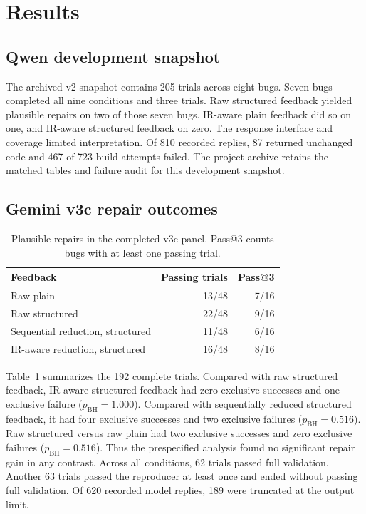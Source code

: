 \documentclass[conference]{IEEEtran}
\begin{document}
\section{Results}

\subsection{Qwen development snapshot}

The archived v2 snapshot contains 205 trials across eight bugs. Seven bugs completed all nine conditions and three trials. Raw structured feedback yielded plausible repairs on two of those seven bugs. IR-aware plain feedback did so on one, and IR-aware structured feedback on zero. The response interface and coverage limited interpretation. Of 810 recorded replies, 87 returned unchanged code and 467 of 723 build attempts failed. The project archive retains the matched tables and failure audit for this development snapshot.

\subsection{Gemini v3c repair outcomes}

\begin{table}[t]
\caption{Plausible repairs in the completed v3c panel. Pass@3 counts bugs with at least one passing trial.}
\label{tab:v3c-repair}
\centering\footnotesize
\begin{tabular}{@{}lrr@{}}
\toprule
Feedback & Passing trials & Pass@3 \\
\midrule
Raw plain & 13/48 & 7/16 \\
Raw structured & 22/48 & 9/16 \\
Sequential reduction, structured & 11/48 & 6/16 \\
IR-aware reduction, structured & 16/48 & 8/16 \\
\bottomrule
\end{tabular}
\end{table}

Table~\ref{tab:v3c-repair} summarizes the 192 complete trials. Compared with raw structured feedback, IR-aware structured feedback had zero exclusive successes and one exclusive failure ($p_{\mathrm{BH}}=1.000$). Compared with sequentially reduced structured feedback, it had four exclusive successes and two exclusive failures ($p_{\mathrm{BH}}=0.516$). Raw structured versus raw plain had two exclusive successes and zero exclusive failures ($p_{\mathrm{BH}}=0.516$). Thus the prespecified analysis found no significant repair gain in any contrast. Across all conditions, 62 trials passed full validation. Another 63 trials passed the reproducer at least once and ended without passing full validation. Of 620 recorded model replies, 189 were truncated at the output limit.
\end{document}
